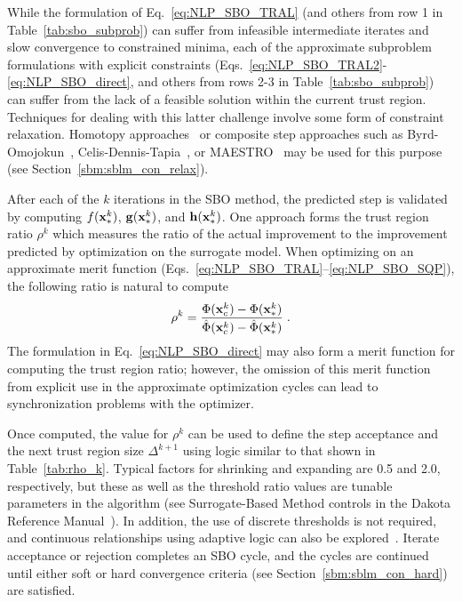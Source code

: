 While the formulation of Eq.~\ref{eq:NLP_SBO_TRAL} (and others from
row 1 in Table~\ref{tab:sbo_subprob}) can suffer from infeasible
intermediate iterates and slow convergence to constrained minima, each
of the approximate subproblem formulations with explicit constraints
(Eqs.~\ref{eq:NLP_SBO_TRAL2}-\ref{eq:NLP_SBO_direct}, and others from
rows 2-3 in Table~\ref{tab:sbo_subprob}) can suffer from the lack of a
feasible solution within the current trust region.  Techniques for
dealing with this latter challenge involve some form of constraint
relaxation.  Homotopy approaches~\cite{Per04a,Per04b} or composite
step approaches such as Byrd-Omojokun~\cite{Omo89},
Celis-Dennis-Tapia~\cite{Cel85}, or MAESTRO~\cite{Ale00} may be used
for this purpose (see Section~\ref{sbm:sblm_con_relax}).

After each of the $k$ iterations in the SBO method, the predicted
step is validated by computing $f({\bf x}^k_\ast)$,
${\bf g}({\bf x}^k_\ast)$, and ${\bf h}({\bf x}^k_\ast)$.  One
approach forms the trust region ratio $\rho^k$ which measures the
ratio of the actual improvement to the improvement predicted by
optimization on the surrogate model.  When optimizing on an approximate 
merit function (Eqs.~\ref{eq:NLP_SBO_TRAL}--\ref{eq:NLP_SBO_SQP}), the 
following ratio is natural to compute
\begin{equation}
\rho^k = \frac{     \Phi({\bf x}^k_c)      - \Phi({\bf x}^k_\ast)}
	      {\hat \Phi({\bf x}^k_c) - \hat \Phi({\bf x}^k_\ast)} \; .
\label{eq:rho_phi_k}
\end{equation}
The formulation in Eq.~\ref{eq:NLP_SBO_direct} may also form a merit
function for computing the trust region ratio; however, the omission
of this merit function from explicit use in the approximate
optimization cycles can lead to synchronization problems with the
optimizer.  %

Once computed, the value for $\rho^k$ can be used to define the step
acceptance and the next trust region size $\Delta^{k+1}$ using logic
similar to that shown in Table~\ref{tab:rho_k}.  Typical factors for
shrinking and expanding are 0.5 and 2.0, respectively, but these as
well as the threshold ratio values are tunable parameters in the
algorithm (see Surrogate-Based Method controls in the Dakota Reference
Manual~\cite{RefMan}).  In addition, the use of discrete thresholds is
not required, and continuous relationships using adaptive logic can
also be explored~\cite{Wuj98a,Wuj98b}.  Iterate acceptance or
rejection completes an SBO cycle, and the cycles are continued until
either soft or hard convergence criteria (see
Section~\ref{sbm:sblm_con_hard}) are satisfied.

